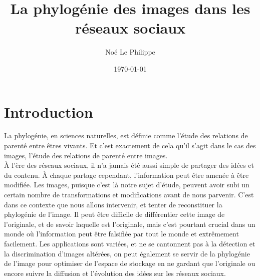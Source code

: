 \documentclass[utf8]{stageM2R} %
\author{Noé Le Philippe}
\title{La phylogénie des images dans les réseaux sociaux}
\date{\today}
\begin{document}
   
\frontmatter  %
\maketitle    %
\cleardoublepage   
\tableofcontents %
\mainmatter  %



\chapter{Introduction}
La phylogénie, en sciences naturelles, est définie\cite{phylogeny} comme l'étude des relations de parenté entre êtres vivants. Et c'est exactement de cela qu'il s'agit dans le cas des images, l'étude des relations de parenté entre images. \\
À l'ère des réseaux sociaux, il n'a jamais été aussi simple de partager des idées et du contenu. À chaque partage cependant, l'information peut être amenée à être modifiée. Les images, puisque c'est là notre sujet d'étude, peuvent avoir subi un certain nombre de transformations et modifications avant de nous parvenir. C'est dans ce contexte que nous allons intervenir, et tenter de reconstituer la phylogénie de l'image. Il peut être difficile de différentier cette image de l'originale, et de savoir laquelle est l'originale, mais c'est pourtant crucial dans un monde où l'information peut être falsifiée par tout le monde et extrêmement facilement. Les applications sont variées, et ne se cantonnent pas à la détection et la discrimination d'images altérées, on peut également se servir de la phylogénie de l'image pour optimiser de l'espace de stockage en ne gardant que l'originale ou encore suivre la diffusion et l'évolution des idées sur les réseaux sociaux.
\newpage
\end{document}
